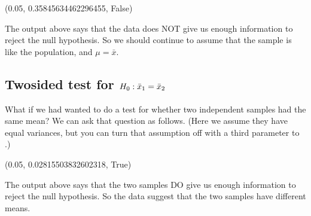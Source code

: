 \documentclass[letterpaper,10pt,english]{jupyterBook}
\begin{document}
\begin{sphinxVerbatim}[commandchars=\\\{\}]
(0.05, 0.35845634462296455, False)
\end{sphinxVerbatim}

\sphinxAtStartPar
The output above says that the data does NOT give us enough information to reject the null hypothesis.  So we should continue to assume that the sample is like the population, and \(\mu=\bar{x}\).


\subsection{Two\sphinxhyphen{}sided test for \protect\(H_0: \bar{x}_1=\bar{x}_2\protect\)}
\label{\detokenize{GB213-review-in-Python:two-sided-test-for-h-0-bar-x-1-bar-x-2}}
\sphinxAtStartPar
What if we had wanted to do a test for whether two independent samples had the same mean?  We can ask that question as follows.  (Here we assume they have equal variances, but you can turn that assumption off with a third parameter to .)

\begin{sphinxVerbatim}[commandchars=\\\{\}]
  
  \PYG{p}{[}       \PYG{p}{]}
  \PYG{p}{[}      \PYG{p}{]}
      
    
  
\end{sphinxVerbatim}

\begin{sphinxVerbatim}[commandchars=\\\{\}]
(0.05, 0.02815503832602318, True)
\end{sphinxVerbatim}

\sphinxAtStartPar
The output above says that the two samples DO give us enough information to reject the null hypothesis.  So the data suggest that the two samples have different means.
\end{document}
